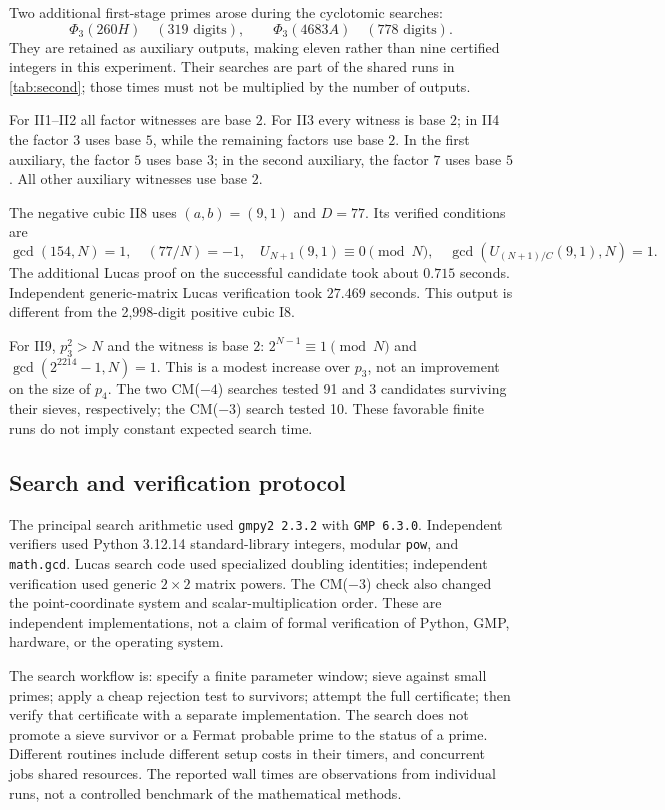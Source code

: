 \documentclass[11pt,a4paper]{article}
\theoremstyle{definition}\newtheorem{definition}[theorem]{Definition}
\theoremstyle{remark}\newtheorem{remark}[theorem]{Remark}
\begin{document}
Two additional first-stage primes arose during the cyclotomic searches:
\[
 \Phi_3(260H)\quad(319\text{ digits}),\qquad
 \Phi_3(4683A)\quad(778\text{ digits}).
\]
They are retained as auxiliary outputs, making eleven rather than nine
certified integers in this experiment. Their searches are part of the shared
runs in \cref{tab:second}; those times must not be multiplied by the number
of outputs.

For II1--II2 all factor witnesses are base $2$. For II3 every witness is
base $2$; in II4 the factor $3$ uses base $5$, while the remaining factors
use base $2$. In the first auxiliary, the factor $5$ uses base $3$; in the
second auxiliary, the factor $7$ uses base $5$. All other auxiliary
witnesses use base $2$.

The negative cubic II8 uses $(a,b)=(9,1)$ and $D=77$. Its verified conditions
are
\[
 \gcd(154,N)=1,\quad (77/N)=-1,\quad
 U_{N+1}(9,1)\equiv0\pmod N,\quad
 \gcd(U_{(N+1)/C}(9,1),N)=1.
\]
The additional Lucas proof on the successful candidate took about $0.715$
seconds. Independent generic-matrix Lucas verification took $27.469$
seconds. This output is different from the 2,998-digit positive cubic I8.

For II9, $p_3^2>N$ and the witness is base $2$:
$2^{N-1}\equiv1\pmod N$ and $\gcd(2^{2214}-1,N)=1$.
This is a modest increase over $p_3$, not an improvement on the size of $p_4$.
The two CM($-4$) searches tested 91 and 3 candidates surviving their sieves,
respectively; the CM($-3$) search tested 10. These favorable finite runs do
not imply constant expected search time.

\subsection{Search and verification protocol}

The principal search arithmetic used \texttt{gmpy2 2.3.2} with
\texttt{GMP 6.3.0}. Independent verifiers used Python 3.12.14 standard-library
integers, modular \texttt{pow}, and \texttt{math.gcd}. Lucas search code used
specialized doubling identities; independent verification used generic
$2\times2$ matrix powers. The CM($-3$) check also changed the point-coordinate
system and scalar-multiplication order. These are independent implementations,
not a claim of formal verification of Python, GMP, hardware, or the operating
system.

The search workflow is: specify a finite parameter window; sieve against
small primes; apply a cheap rejection test to survivors; attempt the full
certificate; then verify that certificate with a separate implementation.
The search does not promote a sieve survivor or a Fermat probable prime to
the status of a prime. Different routines include different setup costs in
their timers, and concurrent jobs shared resources. The reported wall times
are observations from individual runs, not a controlled benchmark of the
mathematical methods.
\end{document}
